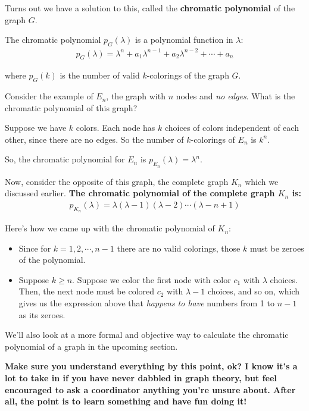 \documentclass[12pt]{exam}
\begin{document}
Turns out we have a solution to this, called the \textbf{chromatic polynomial} of the graph $G$.

The chromatic polynomial $p_G(\lambda)$ is a polynomial function in $\lambda$:
\begin{gather*}
    p_G(\lambda) = \lambda^n + a_1 \lambda^{n-1} + a_2\lambda^{n-2} + \cdots + a_n
\end{gather*}

where $p_G(k)$ is the number of valid $k$-colorings of the graph $G$.

Consider the example of $E_n$, the graph with $n$ nodes and \emph{no edges}. What is the chromatic polynomial of this graph?

Suppose we have $k$ colors. Each node has $k$ choices of colors independent of each other, since there are no edges. So the number of $k$-colorings of $E_n$ is $k^n$.

So, the chromatic polynomial for $E_n$ is $p_{E_n}(\lambda) = \lambda^n$.

Now, consider the opposite of this graph, the complete graph $K_n$ which we discussed earlier. \textbf{The chromatic polynomial of the complete graph $K_n$ is:}
\begin{gather*}
    p_{K_n}(\lambda) = \lambda(\lambda - 1)(\lambda - 2)\cdots(\lambda - n + 1)
\end{gather*}

Here's how we came up with the chromatic polynomial of $K_n$:

\begin{itemize}
    \item Since for $k=1,2,\cdots,n-1$ there are no valid colorings, those $k$ must be zeroes of the polynomial.
    \item Suppose $k \geq n$. Suppose we color the first node with color $c_1$ with $\lambda$ choices. Then, the next node must be colored $c_2$ with $\lambda - 1$ choices, and so on, which gives us the expression above that \emph{happens to have} numbers from 1 to $n-1$ as its zeroes.  
\end{itemize}

We'll also look at a more formal and objective way to calculate the chromatic polynomial of a graph in the upcoming section.

\textbf{Make sure you understand everything by this point, ok? I know it's a lot to take in if you have never dabbled in graph theory, but feel encouraged to ask a coordinator anything you're unsure about. After all, the point is to learn something and have fun doing it!}
\end{document}
